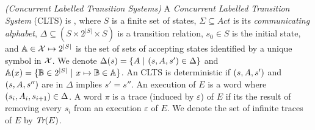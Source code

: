 \begin{definition}
	\label{def:CLTS} \emph{(Concurrent Labelled Transition Systems)} 
	A \emph{Concurrent Labelled Transition System} (CLTS) is \cltsDef, where $S$ is a finite set of states, $\Sigma \subseteq Act$ is its {\em communicating alphabet}, $\Delta \subseteq (S \times 2^{|S|} \times S)$ is a transition relation, $s_0 \in S$ is the initial state, and $\mathbb{A} \in \mathcal{X}\mapsto 2^{|S|}$ is the set of sets of accepting states identified by a unique symbol in $\mathcal{X}$.  We denote $\Delta(s)=\{A~|~(s,A,s') \in \Delta\}$ and $\mathbb{A}(x)=\{\mathbb{B} \in 2^{|S|}~|~x\mapsto\mathbb{B} \in \mathbb{A}\}$. 
	An CLTS is deterministic if $(s,A,s')$ and $(s,A,s'')$ are in $\Delta$ implies $s'=s''$.
	An execution of $E$ is a word \executionDef where $(s_i, A_i, s_{i+1}) \in \Delta$. 
	A word $\pi$ is a trace (induced by $\varepsilon$) of $E$ if its the result of removing every $s_i$ from an execution $\varepsilon$ of $E$. 
	We denote the set of infinite traces of $E$ by $\emph{Tr}(E)$. 
\end{definition}